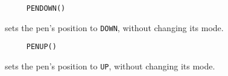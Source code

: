 \begin{verbatim}
     PENDOWN()
\end{verbatim}
sets the pen's position to \texttt{DOWN}, without changing its mode.

\begin{verbatim}
     PENUP()
\end{verbatim}
sets the pen's position to \texttt{UP}, without changing its mode.







